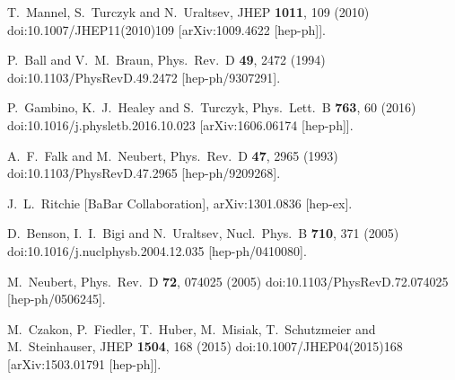 \begin{thebibliography}{99}
  T.~Mannel, S.~Turczyk and N.~Uraltsev,
  JHEP {\bf 1011}, 109 (2010)
  doi:10.1007/JHEP11(2010)109
  [arXiv:1009.4622 [hep-ph]].

  P.~Ball and V.~M.~Braun,
  Phys.\ Rev.\ D {\bf 49}, 2472 (1994)
  doi:10.1103/PhysRevD.49.2472
  [hep-ph/9307291].
  
  P.~Gambino, K.~J.~Healey and S.~Turczyk,
  Phys.\ Lett.\ B {\bf 763}, 60 (2016)
  doi:10.1016/j.physletb.2016.10.023
  [arXiv:1606.06174 [hep-ph]].
   
  
  A.~F.~Falk and M.~Neubert,
  Phys.\ Rev.\ D {\bf 47}, 2965 (1993)
  doi:10.1103/PhysRevD.47.2965
  [hep-ph/9209268].

  J.~L.~Ritchie [BaBar Collaboration],
  arXiv:1301.0836 [hep-ex].
  
  D.~Benson, I.~I.~Bigi and N.~Uraltsev,
  Nucl.\ Phys.\ B {\bf 710}, 371 (2005)
  doi:10.1016/j.nuclphysb.2004.12.035
  [hep-ph/0410080].
   
  
  M.~Neubert,
  Phys.\ Rev.\ D {\bf 72}, 074025 (2005)
  doi:10.1103/PhysRevD.72.074025
  [hep-ph/0506245].
  
  M.~Czakon, P.~Fiedler, T.~Huber, M.~Misiak, T.~Schutzmeier and M.~Steinhauser,
  JHEP {\bf 1504}, 168 (2015)
  doi:10.1007/JHEP04(2015)168
  [arXiv:1503.01791 [hep-ph]].
  

\end{thebibliography}
